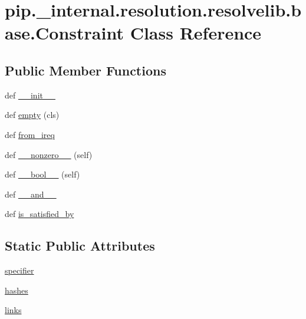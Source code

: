 \hypertarget{classpip_1_1__internal_1_1resolution_1_1resolvelib_1_1base_1_1Constraint}{}\section{pip.\+\_\+internal.\+resolution.\+resolvelib.\+base.\+Constraint Class Reference}
\label{classpip_1_1__internal_1_1resolution_1_1resolvelib_1_1base_1_1Constraint}
\subsection*{Public Member Functions}
\begin{DoxyCompactItemize}
\item 
def \hyperlink{classpip_1_1__internal_1_1resolution_1_1resolvelib_1_1base_1_1Constraint_a023f85f5059a5f6b1eb8248b7ac44c28}{\+\_\+\+\_\+init\+\_\+\+\_\+}
\item 
def \hyperlink{classpip_1_1__internal_1_1resolution_1_1resolvelib_1_1base_1_1Constraint_a0ceba6149737e2aa1c482175849ff7ca}{empty} (cls)
\item 
def \hyperlink{classpip_1_1__internal_1_1resolution_1_1resolvelib_1_1base_1_1Constraint_a8796d037598f616141e4a9b2ea29748d}{from\+\_\+ireq}
\item 
def \hyperlink{classpip_1_1__internal_1_1resolution_1_1resolvelib_1_1base_1_1Constraint_a5874718cd9dba2a068ad7e436ec7c84e}{\+\_\+\+\_\+nonzero\+\_\+\+\_\+} (self)
\item 
def \hyperlink{classpip_1_1__internal_1_1resolution_1_1resolvelib_1_1base_1_1Constraint_a7c11ff4612cff83f88246930ab500d12}{\+\_\+\+\_\+bool\+\_\+\+\_\+} (self)
\item 
def \hyperlink{classpip_1_1__internal_1_1resolution_1_1resolvelib_1_1base_1_1Constraint_a58b5a3074234d111cc4f519259ab0d75}{\+\_\+\+\_\+and\+\_\+\+\_\+}
\item 
def \hyperlink{classpip_1_1__internal_1_1resolution_1_1resolvelib_1_1base_1_1Constraint_a50e64ab73ffb83bf00043d13b6053dd3}{is\+\_\+satisfied\+\_\+by}
\end{DoxyCompactItemize}
\subsection*{Static Public Attributes}
\begin{DoxyCompactItemize}
\item 
\hyperlink{classpip_1_1__internal_1_1resolution_1_1resolvelib_1_1base_1_1Constraint_a6efe5d0496980d2b91e7030765a9ddd0}{specifier}
\item 
\hyperlink{classpip_1_1__internal_1_1resolution_1_1resolvelib_1_1base_1_1Constraint_ac9dc741906db84a1074b714231f35719}{hashes}
\item 
\hyperlink{classpip_1_1__internal_1_1resolution_1_1resolvelib_1_1base_1_1Constraint_a0530fdf107af98c30aa491d98885b618}{links}
\end{DoxyCompactItemize}


